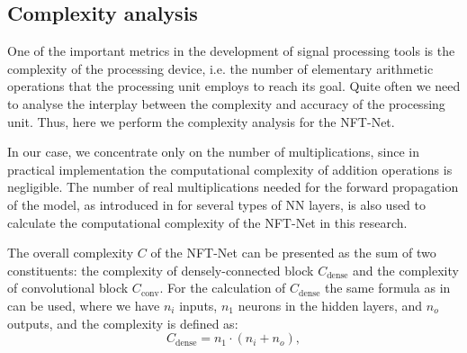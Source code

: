 \subsection{Complexity analysis}
One of the important metrics in the development of signal processing tools is the complexity of the processing device, i.e. the number of elementary arithmetic operations that the processing unit employs to reach its goal. 
Quite often we need to analyse the interplay between the complexity and accuracy of the processing unit. Thus, here we perform the complexity analysis for the NFT-Net.

In our case, we concentrate only on the number of multiplications, since in practical implementation the computational complexity of addition operations is negligible. 
The number of real multiplications needed for the forward propagation of the model, as introduced in \cite{freire2021performance} for several types of NN layers, is also used to calculate the computational complexity of the NFT-Net in this research. 

The overall complexity $C$ of the NFT-Net can be presented as the sum of two constituents: the complexity of densely-connected block $C_{\text{dense}}$ and the complexity of convolutional block $C_{\text{conv}}$. 
For the calculation of $C_{\text{dense}}$ the same formula as in \cite{freire2021performance} can be used, where we have $n_i$ inputs, $n_1$ neurons in the hidden layers, and $n_o$ outputs, and the complexity is defined as:
\begin{equation}
C_{\text{dense}}=  n_1 \cdot (n_{i} + n_{o}) {,}
\label{eq:c_dense}
\end{equation}

